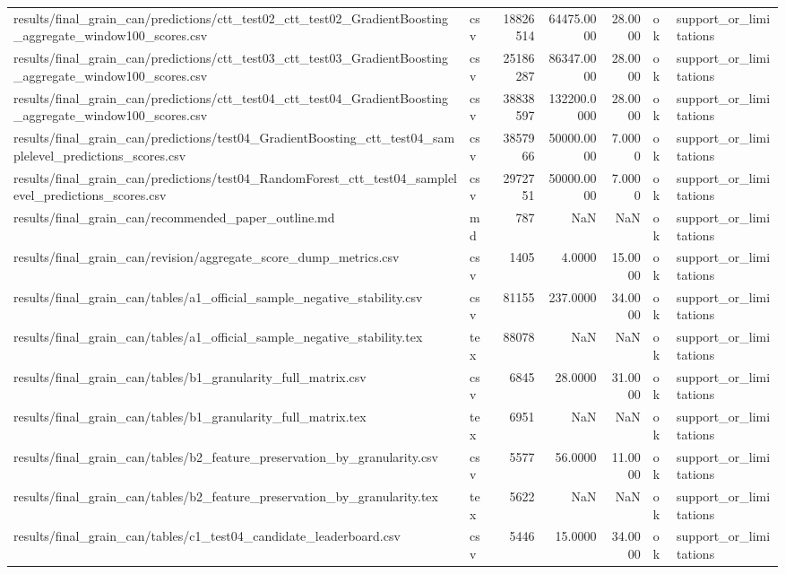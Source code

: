 \begin{tabular}{llrrrll}
results/final_grain_can/predictions/ctt_test02_ctt_test02_GradientBoosting_aggregate_window100_scores.csv & csv & 18826514 & 64475.0000 & 28.0000 & ok & support_or_limitations \\
results/final_grain_can/predictions/ctt_test03_ctt_test03_GradientBoosting_aggregate_window100_scores.csv & csv & 25186287 & 86347.0000 & 28.0000 & ok & support_or_limitations \\
results/final_grain_can/predictions/ctt_test04_ctt_test04_GradientBoosting_aggregate_window100_scores.csv & csv & 38838597 & 132200.0000 & 28.0000 & ok & support_or_limitations \\
results/final_grain_can/predictions/test04_GradientBoosting_ctt_test04_samplelevel_predictions_scores.csv & csv & 3857966 & 50000.0000 & 7.0000 & ok & support_or_limitations \\
results/final_grain_can/predictions/test04_RandomForest_ctt_test04_samplelevel_predictions_scores.csv & csv & 2972751 & 50000.0000 & 7.0000 & ok & support_or_limitations \\
results/final_grain_can/recommended_paper_outline.md & md & 787 & NaN & NaN & ok & support_or_limitations \\
results/final_grain_can/revision/aggregate_score_dump_metrics.csv & csv & 1405 & 4.0000 & 15.0000 & ok & support_or_limitations \\
results/final_grain_can/tables/a1_official_sample_negative_stability.csv & csv & 81155 & 237.0000 & 34.0000 & ok & support_or_limitations \\
results/final_grain_can/tables/a1_official_sample_negative_stability.tex & tex & 88078 & NaN & NaN & ok & support_or_limitations \\
results/final_grain_can/tables/b1_granularity_full_matrix.csv & csv & 6845 & 28.0000 & 31.0000 & ok & support_or_limitations \\
results/final_grain_can/tables/b1_granularity_full_matrix.tex & tex & 6951 & NaN & NaN & ok & support_or_limitations \\
results/final_grain_can/tables/b2_feature_preservation_by_granularity.csv & csv & 5577 & 56.0000 & 11.0000 & ok & support_or_limitations \\
results/final_grain_can/tables/b2_feature_preservation_by_granularity.tex & tex & 5622 & NaN & NaN & ok & support_or_limitations \\
results/final_grain_can/tables/c1_test04_candidate_leaderboard.csv & csv & 5446 & 15.0000 & 34.0000 & ok & support_or_limitations \\

\end{tabular}
